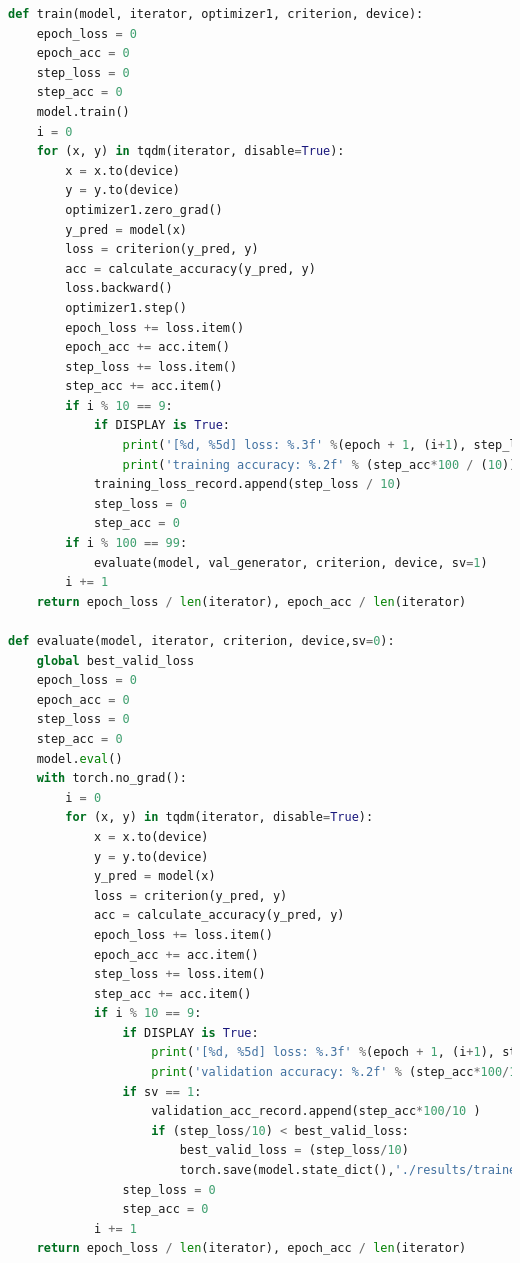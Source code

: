 \documentclass[3p,times,procedia]{elsarticle}
\begin{document}
\begin{lstlisting}[language=Python]
def train(model, iterator, optimizer1, criterion, device):
    epoch_loss = 0
    epoch_acc = 0
    step_loss = 0
    step_acc = 0
    model.train()
    i = 0
    for (x, y) in tqdm(iterator, disable=True):
        x = x.to(device)
        y = y.to(device)
        optimizer1.zero_grad()
        y_pred = model(x)
        loss = criterion(y_pred, y)
        acc = calculate_accuracy(y_pred, y)
        loss.backward()
        optimizer1.step()
        epoch_loss += loss.item()
        epoch_acc += acc.item()
        step_loss += loss.item()
        step_acc += acc.item()
        if i % 10 == 9:
            if DISPLAY is True:                                                          # print every 10 mini-batches
                print('[%d, %5d] loss: %.3f' %(epoch + 1, (i+1), step_loss / 10))    # each epoch has 5000/50 = 100 steps
                print('training accuracy: %.2f' % (step_acc*100 / (10)) )            # printed at 10 step intervals
            training_loss_record.append(step_loss / 10)                          # save training loss with 10 step intervals
            step_loss = 0
            step_acc = 0 
        if i % 100 == 99:
            evaluate(model, val_generator, criterion, device, sv=1)
        i += 1      
    return epoch_loss / len(iterator), epoch_acc / len(iterator)

def evaluate(model, iterator, criterion, device,sv=0):
    global best_valid_loss
    epoch_loss = 0
    epoch_acc = 0
    step_loss = 0
    step_acc = 0
    model.eval()
    with torch.no_grad():
        i = 0
        for (x, y) in tqdm(iterator, disable=True):
            x = x.to(device)
            y = y.to(device)
            y_pred = model(x)
            loss = criterion(y_pred, y)
            acc = calculate_accuracy(y_pred, y)
            epoch_loss += loss.item()
            epoch_acc += acc.item()
            step_loss += loss.item()
            step_acc += acc.item()
            if i % 10 == 9:
                if DISPLAY is True:                                                      # print every 10 mini-batches
                    print('[%d, %5d] loss: %.3f' %(epoch + 1, (i+1), step_loss/10))    # each epoch has 5000/50 = 100 steps
                    print('validation accuracy: %.2f' % (step_acc*100/10) )          # printed at 10 step intervals
                if sv == 1:
                    validation_acc_record.append(step_acc*100/10 )                      # save validation accuracy with 10 step intervals
                    if (step_loss/10) < best_valid_loss:
                        best_valid_loss = (step_loss/10)
                        torch.save(model.state_dict(),'./results/trained_models/'+ model_name+'[RL001].pt')
                step_loss = 0
                step_acc = 0
            i += 1
    return epoch_loss / len(iterator), epoch_acc / len(iterator)


\end{lstlisting}
\end{document}
